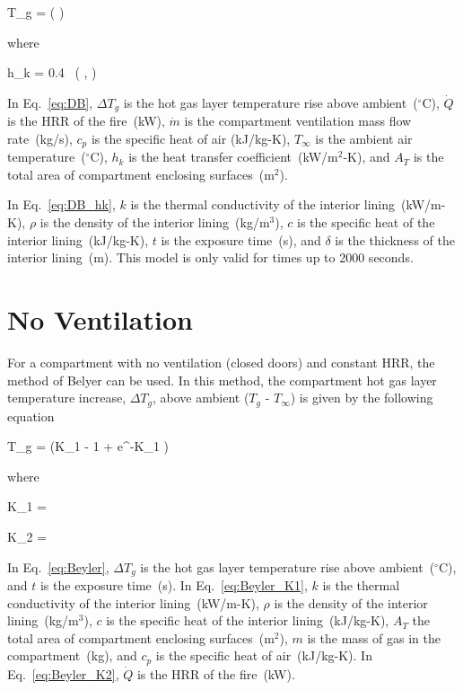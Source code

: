 \be
\Delta T_g = \left(  \right)
\label{eq:DB}
\ee

\noindent where

\be
h_k = 0.4\  \left(  ,  \right)
\label{eq:DB_hk}
\ee

In Eq.~\ref{eq:DB}, $\Delta T_g$ is the hot gas layer temperature rise above ambient~($^\circ$C), $\dot Q$ is the HRR of the fire~(kW), $\dot m$ is the compartment ventilation mass flow rate~(kg/s), $c_p$ is the specific heat of air (kJ/kg-K), $T_\infty$ is the ambient air temperature~($^\circ$C), $h_k$ is the heat transfer coefficient~(kW/m$^2$-K), and $A_T$ is the total area of compartment enclosing surfaces~(m$^2$).

In Eq.~\ref{eq:DB_hk}, $k$ is the thermal conductivity of the interior lining~(kW/m-K), $\rho$ is the density of the interior lining~(kg/m$^3$), $c$ is the specific heat of the interior lining~(kJ/kg-K), $t$ is the exposure time~(s), and $\delta$ is the thickness of the interior lining~(m). This model is only valid for times up to 2000 seconds.



\clearpage


\section{No Ventilation}

For a compartment with no ventilation (closed doors) and constant HRR, the method of Belyer can be used. In this method, the compartment hot gas layer temperature increase, $\Delta T_g$, above ambient ($T_g$ - $T_\infty$) is given by the following equation

\be
\Delta T_g =  (K_1  - 1 + e^{-K_1 })
\label{eq:Beyler}
\ee

\noindent where

\be
K_1 = 
\label{eq:Beyler_K1}
\ee

\be
K_2 = 
\label{eq:Beyler_K2}
\ee

In Eq.~\ref{eq:Beyler}, $\Delta T_g$ is the hot gas layer temperature rise above ambient~($^\circ$C), and $t$ is the exposure time~(s). In Eq.~\ref{eq:Beyler_K1}, $k$ is the thermal conductivity of the interior lining~(kW/m-K), $\rho$ is the density of the interior lining~(kg/m$^3$), $c$ is the specific heat of the interior lining~(kJ/kg-K), $A_T$ the total area of compartment enclosing surfaces~(m$^2$), $m$ is the mass of gas in the compartment~(kg), and $c_p$ is the specific heat of air~(kJ/kg-K). In Eq.~\ref{eq:Beyler_K2}, $\dot Q$ is the HRR of the fire~(kW).


